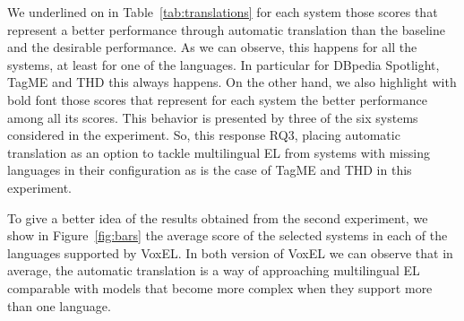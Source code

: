 \documentclass{llncs}
\begin{document}

We underlined on in Table~\ref{tab:translations} for each system those scores that represent a better performance through automatic translation than the baseline and the desirable performance. As we can observe, this happens for all the systems, at least for one of the languages. In particular for DBpedia Spotlight, TagME and THD this always happens. On the other hand, we also highlight with bold font those scores that represent for each system the better performance among all its scores. This behavior is presented by three of the six systems considered in the experiment. So, this response RQ3, placing automatic translation as an option to tackle multilingual EL from systems with missing languages in their configuration as is the case of TagME and THD in this experiment. 

To give a better idea of the results obtained from the second experiment, we show in Figure~\ref{fig:bars} the average score of the selected systems in each of the languages supported by VoxEL. In both version of VoxEL we can observe that in average, the automatic translation is a way of approaching multilingual EL comparable with models that become more complex when they support more than one language. 
\end{document}
